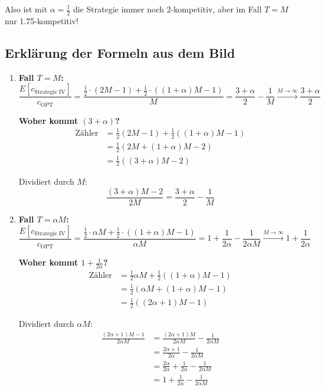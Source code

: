 \documentclass[12pt,a4paper]{article}
\theoremstyle{definition}
\begin{document}
Also ist mit $\alpha = \frac{1}{2}$ die Strategie immer noch 2-kompetitiv, aber im Fall $T = M$ nur 1.75-kompetitiv!

\subsection{Erklärung der Formeln aus dem Bild}

\begin{enumerate}
    \item \textbf{Fall $T = M$:}
    \[
    \frac{E[c_{\text{Strategie IV}}]}{c_{\text{OPT}}} = \frac{\frac{1}{2} \cdot (2M-1) + \frac{1}{2} \cdot ((1+\alpha)M-1)}{M} = \frac{3+\alpha}{2} - \frac{1}{M} \xrightarrow{M \to \infty} \frac{3+\alpha}{2}
    \]
    
    \textbf{Woher kommt $(3+\alpha)$?}
    \begin{align*}
    \text{Zähler} &= \frac{1}{2}(2M - 1) + \frac{1}{2}((1+\alpha)M - 1) \\
    &= \frac{1}{2}(2M + (1+\alpha)M - 2) \\
    &= \frac{1}{2}((3+\alpha)M - 2)
    \end{align*}
    
    Dividiert durch $M$:
    \[
    \frac{(3+\alpha)M - 2}{2M} = \frac{3+\alpha}{2} - \frac{1}{M}
    \]
    
    \item \textbf{Fall $T = \alpha M$:}
    \[
    \frac{E[c_{\text{Strategie IV}}]}{c_{\text{OPT}}} = \frac{\frac{1}{2} \cdot \alpha M + \frac{1}{2} \cdot ((1+\alpha)M-1)}{\alpha M} = 1 + \frac{1}{2\alpha} - \frac{1}{2\alpha M} \xrightarrow{M \to \infty} 1 + \frac{1}{2\alpha}
    \]
    
    \textbf{Woher kommt $1 + \frac{1}{2\alpha}$?}
    \begin{align*}
    \text{Zähler} &= \frac{1}{2} \alpha M + \frac{1}{2}((1+\alpha)M - 1) \\
    &= \frac{1}{2}(\alpha M + (1+\alpha)M - 1) \\
    &= \frac{1}{2}((2\alpha + 1)M - 1)
    \end{align*}
    
    Dividiert durch $\alpha M$:
    \begin{align*}
    \frac{(2\alpha + 1)M - 1}{2\alpha M} &= \frac{(2\alpha + 1)M}{2\alpha M} - \frac{1}{2\alpha M} \\
    &= \frac{2\alpha + 1}{2\alpha} - \frac{1}{2\alpha M} \\
    &= \frac{2\alpha}{2\alpha} + \frac{1}{2\alpha} - \frac{1}{2\alpha M} \\
    &= 1 + \frac{1}{2\alpha} - \frac{1}{2\alpha M}
    \end{align*}
\end{enumerate}
\end{document}

